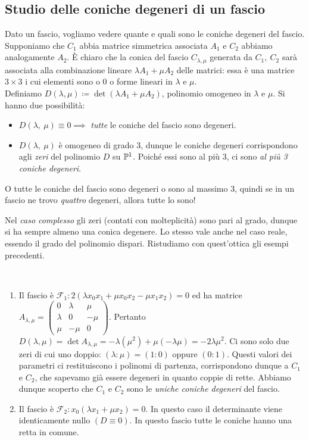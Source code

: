 \subsection{Studio delle coniche degeneri di un fascio}
Dato un fascio, vogliamo vedere quante e quali sono le coniche degeneri del fascio. Supponiamo che $C_1$ abbia matrice simmetrica associata $A_1$ e $C_2$ abbiamo analogamente $A_2$. È chiaro che la conica del fascio $C_{\lambda,\mu}$ generata da $C_1,\ C_2$ sarà associata alla combinazione lineare $\lambda A_1+\mu A_2$ delle matrici: essa è una matrice $3\times 3$ i cui elementi sono o $0$ o forme lineari in $\lambda$ e $\mu$.\\
Definiamo $D(\lambda,\mu)\coloneqq \det (\lambda A_1+\mu A_2)$, polinomio omogeneo in $\lambda$ e $\mu$. Si hanno due possibilità:
	\begin{itemize}
		\item	$D(\lambda,\ \mu)\equiv 0\implies$ \textit{tutte} le coniche del fascio sono degeneri.
		\item	$D(\lambda,\ \mu)$ è omogeneo di grado 3, dunque le	coniche degeneri corrispondono agli \textit{zeri} del polinomio $D$ su $\proj[1]{\ }$. Poiché essi sono al più 3, ci sono \textit{al più 3 coniche degeneri}.
	\end{itemize}
\begin{tips}
	O tutte le coniche del fascio sono degeneri o sono al massimo 3, quindi se in un fascio ne trovo \textit{quattro} degeneri, allora tutte lo sono!
\end{tips}
Nel \textit{caso complesso} gli zeri (contati con molteplicità) sono pari al grado, dunque si ha sempre almeno una conica degenere. Lo stesso vale anche nel caso reale, essendo il grado del polinomio dispari.
Ristudiamo con quest'ottica gli esempi precedenti.
\begin{examples}~{}
	\begin{enumerate}
		\item	Il fascio è $\mathcal{F}_1\colon 2(\lambda x_0x_1 +\mu x_0x_2 -\mu x_1x_2)=0$ ed ha matrice $A_{\lambda,\mu}=\begin{pmatrix}
			0 & \lambda & \mu \\
			\lambda & 0 & -\mu \\
			\mu & -\mu & 0
		\end{pmatrix}$. Pertanto $D(\lambda,\mu)=\det A_{\lambda,\mu}=-\lambda(\mu^2)+\mu(-\lambda \mu)=-2\lambda\mu^2$. Ci sono solo due zeri di cui uno doppio: $(\lambda\colon\mu)=(1\colon 0)$ oppure $(0\colon 1)$. Questi valori dei parametri ci restituiscono i polinomi di partenza, corrispondono dunque a $C_1$ e $C_2$, che sapevamo già essere degeneri in quanto coppie di rette. Abbiamo dunque scoperto che $C_1$ e $C_2$ sono le \textit{uniche coniche degeneri} del fascio.
		\item	Il fascio è $\mathcal{F}_2 \colon x_0(\lambda x_1+\mu x_2)=0$. In questo caso il determinante viene identicamente nullo $\left(D\equiv 0\right)$. In questo fascio tutte le coniche hanno una retta in comune.
	\end{enumerate}
\end{examples}

